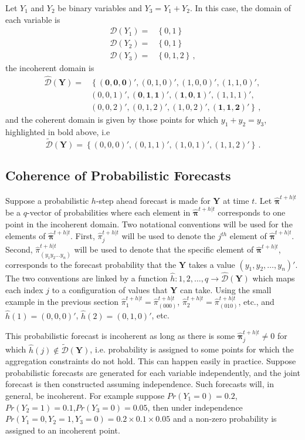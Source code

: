 \documentclass[a4paper,review,12pt,authoryear]{elsarticle}
\newcommand{\bY}{\mathbf{Y}}
\newcommand{\bpi}{\bm{\pi}}
\begin{document}
  Let $Y_1$ and $Y_2$ be binary variables and $Y_3=Y_1+Y_2$. In this case, the domain of each variable is
  \begin{align*}
    \mathcal{D}(Y_1)=&\left\{0,1\right\}\\
    \mathcal{D}(Y_2)=&\left\{0,1\right\}\\
    \mathcal{D}(Y_3)=&\left\{0,1,2\right\}\,,
  \end{align*}  
  the incoherent domain is
  \begin{align*}
  \hat{\mathcal D}(\bY)=&\left\{\mathbf{(0,0,0)'},(0,1,0)',(1,0,0)',(1,1,0)',\right.\\
  &\left.(0,0,1)',\mathbf{(0,1,1)'},\mathbf{(1,0,1)'},(1,1,1)',\right.\\
  &\left.(0,0,2)',(0,1,2)',(1,0,2)',\mathbf{(1,1,2)'}\right\}\,,
  \end{align*}
  and the coherent domain is given by those points for which $y_1+y_2=y_3$, highlighted in bold above, i.e
  \[
      \tilde{\mathcal D}(\bY)=\left\{(0,0,0)',(0,1,1)',(1,0,1)',(1,1,2)'\right\}\,.
  \]
    
  \subsection{Coherence of Probabilistic Forecasts}

  Suppose a probabilistic $h$-step ahead forecast is made for $\bY$ at time $t$. 
  Let $\hat{\bpi}^{t+h|t}$ be a $q$-vector of probabilities where each element in $\hat{\bpi}^{t+h|t}$ corresponds to one point in the incoherent domain. 
  Two notational conventions will be used for the elements of $\hat{\bpi}^{t+h|t}$. 
  First, $\hat{\pi}_j^{t+h|t}$ will be used to denote the $j^{th}$ element of $\hat{\bpi}^{t+h|t}$.  
  Second, $\hat{\pi}_{(y_1 y_2 \dots y_n)}^{t+h|t}$ will be used to denote that the specific element of $\hat{\bpi}^{t+h|t}$, corresponds to the forecast probability that the $\bY$ takes a value $(y_1,y_2,\dots,y_n)'$. The two conventions are linked by a function $\hat{h}:{1,2,\dots,q}\rightarrow\hat{\mathcal{D}}(\bY)$ which maps each index $j$ to a configuration of values that $\bY$ can take. 
  Using the small example in the previous section $\hat{\pi}_1^{t+h|t}=\hat{\pi}_{(000)}^{t+h|t}$, $\hat{\pi}_2^{t+h|t}=\hat{\pi}_{(010)}^{t+h|t}$, etc., and $\hat{h}(1)=(0,0,0)'$, $\hat{h}(2)=(0,1,0)'$, etc.
  
  This probabilistic forecast is incoherent as long as there is some $\hat{\bpi}^{t+h|t}_j\neq 0$ for which $\hat{h}(j)\notin\tilde{\mathcal{D}}(\bY)$, i.e. probability is assigned to some points for which the aggregation constraints do not hold. 
  This can happen easily in practice. Suppose probabilistic forecasts are generated for each variable independently, and the joint forecast is then constructed assuming independence. 
  Such forecasts will, in general, be incoherent. 
  For example suppose $Pr(Y_1=0)=0.2$,$Pr(Y_2=1)=0.1$,$Pr(Y_3=0)=0.05$, then under independence $Pr(Y_1=0,Y_2=1,Y_3=0)=0.2\times0.1\times0.05$ and a non-zero probability is assigned to an incoherent point.
  
\end{document}
